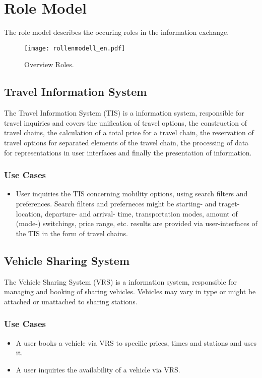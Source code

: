\chapter{Role Model}
\label{cha:Rollenmodell}

The role model describes the occuring roles in the information exchange.

\begin{figure*}[ht]
\centering
\texttt{[image: rollenmodell\_en.pdf]}
\caption{Overview Roles.\label{fig:Rollenmodell}}
\end{figure*}

\section*{Travel Information System}
\label{sec:Rollenmodell:RIS}
The Travel Information System (TIS) is a information system, responsible for travel inquiries and covers the unification of travel options, the construction of travel chains, the calculation of a total price for a travel chain, the reservation of travel options for separated elements of the travel chain, the processing of data for representations in user interfaces and finally the presentation of information.

\subsection*{Use Cases}
\begin{itemize}
\item User inquiries the TIS concerning mobility options, using search filters and preferences. Search filters and preferneces might be starting- and traget- location, departure- and arrival- time, transportation modes, amount of (mode-) switchings, price range, etc. results are provided via user-interfaces of the TIS in the form of travel chains. 
\end{itemize}

\section*{Vehicle Sharing System}
\label{sec:Rollenmodell:FVS}
The Vehicle Sharing System (VRS) is a information system, responsible for managing and booking of sharing vehicles. Vehicles may vary in type or might be attached or unattached to sharing stations.

\subsection*{Use Cases}
\begin{itemize}
\item A user books a vehicle via VRS to specific prices, times and stations and uses it.
\item A user inquiries the availability of a vehicle via VRS. 
\end{itemize}

